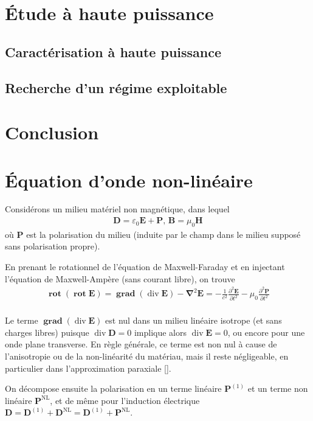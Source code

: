 \documentclass[11pt,a4paper] { article}
\newcommand{\ncite}[1]{[\citenum{#1}]}
\DeclareMathOperator{\divg}{div}
\DeclareMathOperator{\rot}{\mathbf{rot}}
\DeclareMathOperator{\grad}{\mathbf{grad}}
\newcommand{\mathsc}[1]{\mathrm{\scriptscriptstyle {#1}}}
\renewcommand{\v}[1]{\boldsymbol{\mathbf{#1}}}
\begin{document}
\section{Étude à haute puissance}
\subsection{Caractérisation à haute puissance}
\subsection{Recherche d'un régime exploitable}
\section{Conclusion}

\appendix
\section{\'Equation d'onde non-linéaire} 
\label{NL}
Considérons un milieu matériel non magnétique, dans lequel
\begin{align*}
	\v D = \varepsilon_0 \v E + \v P \text{, } \v B = \mu_0 \v H
\end{align*}
où $\v P$ est la polarisation du milieu (induite par le champ dans le milieu supposé sans polarisation propre).

En prenant le rotationnel de l'équation de Maxwell-Faraday et en injectant l'équation de Maxwell-Ampère (sans courant libre), on trouve
\begin{align*}
	\rot (\rot \v E) = \grad (\divg \v E) - \v \nabla^2 \v E = - \frac{1}{c^2} \frac{\partial^2 \v E}{\partial t^2} - \mu_0 \frac{\partial^2 \v P}{\partial t^2} \\
\end{align*}

Le terme $\grad (\divg \v E)$ est nul dans un milieu linéaire isotrope (et sans charges libres) puisque $\divg \v D=0$ implique alors $\divg \v E = 0$, ou encore pour une onde plane transverse. En règle générale, ce terme est non nul à cause de l'anisotropie ou de la non-linéarité du matériau, mais il reste négligeable, en particulier dans l'approximation paraxiale \ncite{boyd}.



On décompose ensuite la polarisation en un terme linéaire $\v P^\mathsc{(1)}$ et un terme non linéaire $\v P^\mathsc{NL}$, et de même pour l'induction électrique $\v D = \v D^\mathsc{(1)} + \v D^\mathsc{NL} = \v D^\mathsc{(1)} + \v P^\mathsc{NL}$. 
\end{document}
